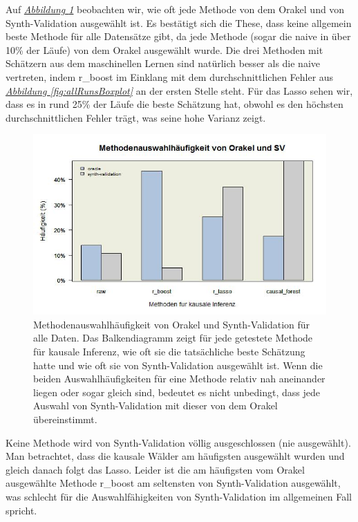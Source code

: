 \documentclass[12pt,a4paper,twoside]{scrartcl}
\numberwithin{equation}{section}
\newcommand{\reffig}[1]{\emph{\hyperref[#1]{Abbildung \ref*{#1}}}}
\begin{document}
\noindent
Auf \reffig{fig:allRunsBarplot} beobachten wir, wie oft jede Methode von dem Orakel und von Synth-Validation ausgewählt ist. Es bestätigt sich die These, dass keine allgemein beste Methode für alle Datensätze gibt, da jede Methode (sogar die naive in über 10\% der Läufe) von dem Orakel ausgewählt wurde. Die drei Methoden mit Schätzern aus dem maschinellen Lernen sind natürlich besser als die naive vertreten, indem r\_boost im Einklang mit dem durchschnittlichen Fehler aus \reffig{fig:allRunsBoxplot} an der ersten Stelle steht. Für das Lasso sehen wir, dass es in rund 25\% der Läufe die beste Schätzung hat, obwohl es den höchsten durchschnittlichen Fehler trägt, was seine hohe Varianz zeigt. \par

\begin{center}
\begin{figure}[h]
    \centering
    \includegraphics[height=0.5\textwidth, width=1\textwidth]{figures/plots/allRunsBarplot.jpeg}
    \caption[Methodenauswahlhäufigkeit von Orakel und Synth-Validation für alle Daten]{Methodenauswahlhäufigkeit von Orakel und Synth-Validation für alle Daten. Das Balkendiagramm zeigt für jede getestete Methode für kausale Inferenz, wie oft   sie die tatsächliche beste Schätzung hatte und wie oft sie von Synth-Validation ausgewählt ist. Wenn die beiden Auswahlhäufigkeiten für eine Methode relativ nah aneinander liegen oder sogar gleich sind, bedeutet es nicht unbedingt, dass jede Auswahl von Synth-Validation mit dieser von dem Orakel übereinstimmt.}\label{fig:allRunsBarplot}
  \end{figure}
\end{center}

\noindent
Keine Methode wird von Synth-Validation völlig ausgeschlossen (nie ausgewählt). Man betrachtet, dass die kausale Wälder am häufigsten ausgewählt wurden und gleich danach folgt das Lasso. Leider ist die am häufigsten vom Orakel ausgewählte Methode r\_boost am seltensten von Synth-Validation ausgewählt, was schlecht für die Auswahlfähigkeiten von Synth-Validation im allgemeinen Fall spricht. \par
\end{document}
